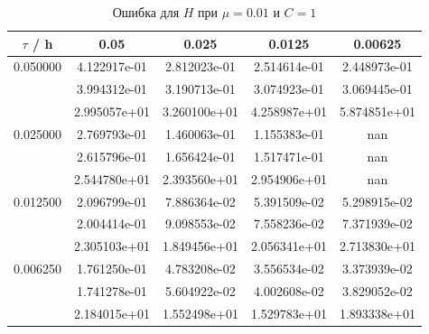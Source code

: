 \documentclass[specialist,subf,href,colorlinks=true,12pt
,times,mtpro,specialist
]{disser}
\begin{document}
\begin{table}[H]
\small
\caption{Ошибка для $H$ при $\mu=0.01$ и $C = 1$}
\begin{center}
\begin{tabular}{|c|c|c|c|c|}
\hline
$\tau$ / h & 0.05 & 0.025 & 0.0125 & 0.00625 \\
\hline
0.050000 & 4.122917e-01  & 2.812023e-01  & 2.514614e-01  & 2.448973e-01 \\
 & 3.994312e-01  & 3.190713e-01  & 3.074923e-01  & 3.069445e-01 \\
 & 2.995057e+01  & 3.260100e+01  & 4.258987e+01  & 5.874851e+01 \\
\hline
0.025000 & 2.769793e-01  & 1.460063e-01  & 1.155383e-01  & nan \\
 & 2.615796e-01  & 1.656424e-01  & 1.517471e-01  & nan \\
 & 2.544780e+01  & 2.393560e+01  & 2.954906e+01  & nan \\
\hline
0.012500 & 2.096799e-01  & 7.886364e-02  & 5.391509e-02  & 5.298915e-02 \\
 & 2.004414e-01  & 9.098553e-02  & 7.558236e-02  & 7.371939e-02 \\
 & 2.305103e+01  & 1.849456e+01  & 2.056341e+01  & 2.713830e+01 \\
\hline
0.006250 & 1.761250e-01  & 4.783208e-02  & 3.556534e-02  & 3.373939e-02 \\
 & 1.741278e-01  & 5.604922e-02  & 4.002608e-02  & 3.829052e-02 \\
 & 2.184015e+01  & 1.552498e+01  & 1.529783e+01  & 1.893338e+01 \\
\hline
\end{tabular}
\end{center}
\end{table}
\end{document}
